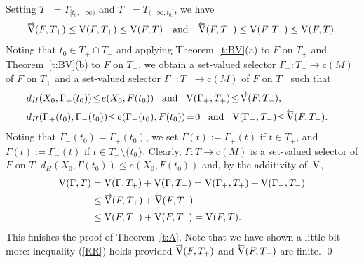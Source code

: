 \documentclass[preprint,12pt]{elsarticle}
\newcommand{\eq}[1]{\mbox{\rm(\ref{#1})}}
\newcommand{\nV}{\mbox{\rm V}}
\newcommand{\riV}{{\scriptstyle\overrightarrow{\mbox{\rm V}}}}
\newcommand{\leV}{{\scriptstyle\overleftarrow{\mbox{\rm V}}}}
\begin{document}
\begin{pfA}
Setting $T_+=T_{[t_0,+\infty)}$ and $T_-=T_{(-\infty,t_0]}$, we have
  \begin{equation*}
\riV(F,T_+)\le\nV(F,T_+)\le\nV(F,T)\quad\mbox{and}\quad
  \leV(F,T_-)\le\nV(F,T_-)\le\nV(F,T).
  \end{equation*}
Noting that $t_0\in T_+\cap T_-$ and applying Theorem~\ref{t:BV}(a) to $F$ on $T_+$
and Theorem~\ref{t:BV}(b) to $F$ on $T_-$, we obtain a set-valued selector
$\Gamma_+:T_+\to\mbox{c}(M)$ of $F$ on $T_+$ and a set-valued selector
$\Gamma_-:T_-\to\mbox{c}(M)$ of $F$ on $T_-$ such that
  \begin{eqnarray*}
&d_H(X_0,\Gamma_+(t_0))\!\le\! e(X_0,F(t_0))\quad\!\mbox{and}\quad\!
  \nV(\Gamma_+,T_+)\!\le\!\riV(F,T_+),&\\[2pt]
&d_H(\Gamma_+(t_0),\Gamma_-(t_0))\!\le\! e(\Gamma_+(t_0),F(t_0))\!=\!0\quad\!
  \mbox{and}\!\quad\nV(\Gamma_-,T_-)\!\le\!\leV(F,T_-).&
  \end{eqnarray*}
Noting that $\Gamma_-(t_0)=\Gamma_+(t_0)$, we set $\Gamma(t):=\Gamma_+(t)$
if $t\in T_+$, and $\Gamma(t):=\Gamma_-(t)$ if $t\in T_-\setminus\{t_0\}$.
Clearly, $\Gamma:T\to\mbox{c}(M)$ is a set-valued selector of $F$ on $T$,
$d_H(X_0,\Gamma(t_0))\le e(X_0,F(t_0))$ and, by the additivity of~$\nV$,
  \begin{align}
\nV(\Gamma,T)&=\nV(\Gamma,T_+)+\nV(\Gamma,T_-)=
  \nV(\Gamma_+,T_+)+\nV(\Gamma_-,T_-)\nonumber\\[1pt]
&\le\riV(F,T_+)+\leV(F,T_-) \label{RR}\\[2pt]
&\le\nV(F,T_+)+\nV(F,T_-)=\nV(F,T). \nonumber
  \end{align}
This finishes the proof of Theorem~\ref{t:A}. Note that we have shown a little
bit more: inequality \eq{RR} holds provided $\riV(F,T_+)$ and $\leV(F,T_-)$ are finite.
\qed\end{pfA}
\end{document}
